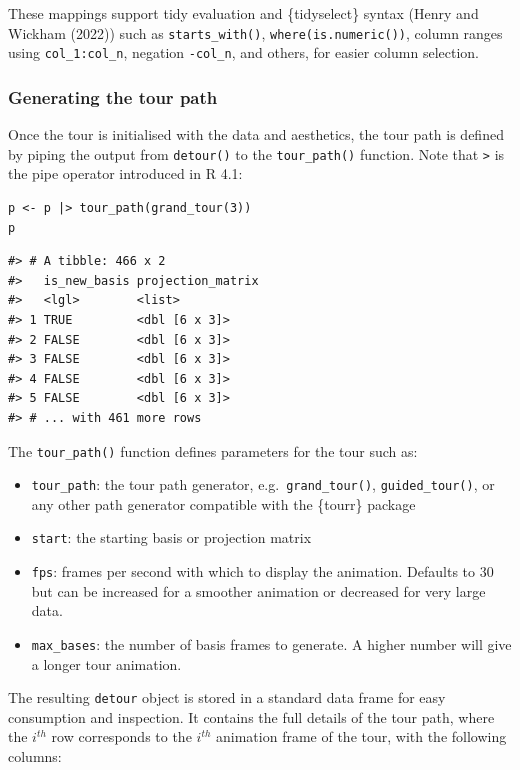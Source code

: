 These mappings support tidy evaluation and \{tidyselect\} syntax (Henry and Wickham (2022)) such as \texttt{starts\_with()}, \texttt{where(is.numeric())}, column ranges using \texttt{col\_1:col\_n}, negation \texttt{-col\_n}, and others, for easier column selection.

\hypertarget{generating-the-tour-path}{%
\subsubsection{Generating the tour path}\label{generating-the-tour-path}}

Once the tour is initialised with the data and aesthetics, the tour path is defined by piping the output from \texttt{detour()} to the \texttt{tour\_path()} function. Note that \texttt{\textbar{}\textgreater{}} is the pipe operator introduced in R 4.1:

\pagebreak

\begin{verbatim}
p <- p |> tour_path(grand_tour(3))
p
\end{verbatim}

\begin{verbatim}
#> # A tibble: 466 x 2
#>   is_new_basis projection_matrix
#>   <lgl>        <list>           
#> 1 TRUE         <dbl [6 x 3]>    
#> 2 FALSE        <dbl [6 x 3]>    
#> 3 FALSE        <dbl [6 x 3]>    
#> 4 FALSE        <dbl [6 x 3]>    
#> 5 FALSE        <dbl [6 x 3]>    
#> # ... with 461 more rows
\end{verbatim}

The \texttt{tour\_path()} function defines parameters for the tour such as:

\begin{itemize}
\tightlist
\item
  \texttt{tour\_path}: the tour path generator, e.g.~\texttt{grand\_tour()}, \texttt{guided\_tour()}, or any other path generator compatible with the \{tourr\} package
\item
  \texttt{start}: the starting basis or projection matrix
\item
  \texttt{fps}: frames per second with which to display the animation. Defaults to 30 but can be increased for a smoother animation or decreased for very large data.
\item
  \texttt{max\_bases}: the number of basis frames to generate. A higher number will give a longer tour animation.
\end{itemize}

The resulting \texttt{detour} object is stored in a standard data frame for easy consumption and inspection. It contains the full details of the tour path, where the \(i^{th}\) row corresponds to the \(i^{th}\) animation frame of the tour, with the following columns:

